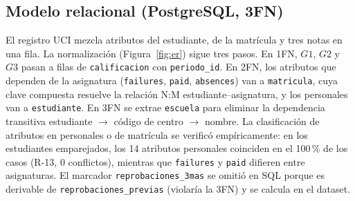\documentclass[11pt,a4paper]{article}
\begin{document}
\subsection{Modelo relacional (PostgreSQL, 3FN)}
El registro UCI mezcla atributos del estudiante, de la matrícula y tres notas en una fila. La
normalización (Figura~\ref{fig:er}) sigue tres pasos. En 1FN, $G1$, $G2$ y $G3$ pasan a filas de
\texttt{calificacion} con \texttt{periodo\_id}. En 2FN, los atributos que dependen de la asignatura
(\texttt{failures}, \texttt{paid}, \texttt{absences}) van a \texttt{matricula}, cuya clave compuesta
resuelve la relación N:M estudiante–asignatura, y los personales van a \texttt{estudiante}. En 3FN se
extrae \texttt{escuela} para eliminar la dependencia transitiva estudiante $\rightarrow$ código de
centro $\rightarrow$ nombre. La clasificación de atributos en personales o de matrícula se verificó
empíricamente: en los \nPares{} estudiantes emparejados, los 14 atributos personales coinciden en el
100\,\% de los casos (R-13, 0 conflictos), mientras que \texttt{failures} y \texttt{paid} difieren
entre asignaturas. El marcador \texttt{reprobaciones\_3mas} se omitió en SQL porque es derivable de
\texttt{reprobaciones\_previas} (violaría la 3FN) y se calcula en el dataset.
\end{document}
